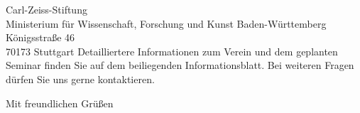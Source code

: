 \documentclass[../style/orpheus,fontsize=11pt]{scrlttr2}
\begin{document}
\begin{letter}{
\noindent Carl-Zeiss-Stiftung \\
Ministerium f\"ur Wissenschaft, Forschung und Kunst Baden-W\"urttemberg \\
K\"onigsstra\ss e 46\\
70173 Stuttgart
}
Detailliertere Informationen zum Verein und dem geplanten Seminar finden Sie auf dem beiliegenden Informationsblatt.  Bei weiteren Fragen  d\"urfen Sie uns gerne kontaktieren.



\closing{Mit freundlichen Gr\"u\ss en}


\end{letter}
\end{document}
